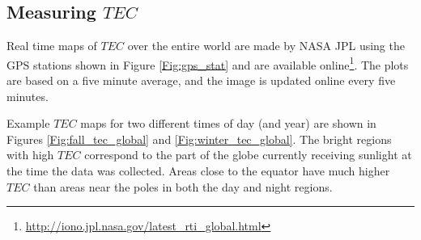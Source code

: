 \subsection{Measuring $TEC$}

Real time maps of $TEC$ over the entire world are made by NASA JPL using the GPS stations shown in Figure \ref{Fig:gps_stat} and are available online\footnote{\url{http://iono.jpl.nasa.gov/latest_rti_global.html}}. The plots are based on a five minute average, and the image is updated online every five minutes. 

Example $TEC$ maps for two different times of day (and year) are shown in Figures \ref{Fig:fall_tec_global} and \ref{Fig:winter_tec_global}.  The bright regions with high $TEC$ correspond to the part of the globe currently receiving sunlight at the time the data was collected. Areas close to the equator have much higher $TEC$ than areas near the poles in both the day and night regions.

